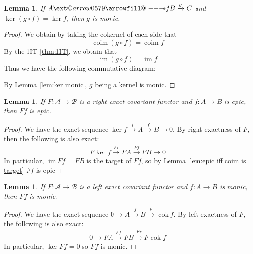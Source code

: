 \documentclass{article}
\makeatletter
\newcommand{\fA}{\mathscr{A}}
\newcommand{\fB}{\mathscr{B}}
\DeclareMathOperator{\im}{im}
\DeclareMathOperator{\coim}{coim}
\DeclareMathOperator{\cok}{cok}
\newcommand\xtwoheadrightarrow[2][]{%
  \ext@arrow 0579{\twoheadrightarrowfill@}{#1}{#2}}
\newcommand\twoheadrightarrowfill@{%
  \arrowfill@\relbar\relbar\twoheadrightarrow}
\newtheorem{lemma}[theorem]{Lemma}
\makeatother
\begin{document}
\begin{lemma}\label{lem:comp with epic and ker}
    If $A\xtwoheadrightarrow{f}B\xrightarrow{g} C$ and $\ker(g\circ f)=\ker f$, then $g$ is monic.
\end{lemma}
\begin{proof}
    We obtain by taking the cokernel of each side that
    \[
    \coim (g\circ f)=\coim f
    \]
    By the 1IT \ref{thm:1IT}, we obtain that
    \[
    \im (g\circ f)=\im f
    \]
    Thus we have the following commutative diagram:
    \begin{center}
    \end{center}
    By Lemma \ref{lem:ker monic}, $g$ being a kernel is monic.
\end{proof}
\begin{lemma}\label{lem:covariant right exact preserves epic}
    If $F:\fA \to \fB$ is a right exact covariant functor and $f:A\to B$ is epic, then $Ff$ is epic.
\end{lemma}
\begin{proof}
    We have the exact sequence $\ker f \xrightarrow{i} A \xrightarrow{f}B \rightarrow0 $. By right exactness of $F$, then the following is also exact:
    \begin{align*}
        F\ker f \xrightarrow{Fi} FA \xrightarrow{Ff} FB \rightarrow 0
    \end{align*}
    In particular, $\im Ff=FB$ is the target of $Ff$, so by Lemma \ref{lem:epic iff coim is target} $Ff$ is epic.
\end{proof}
\begin{lemma}\label{lem:covariant left exact preserves monic}
    If $F:\fA \to \fB$ is a left exact covariant functor and $f:A\to B$ is monic, then $Ff$ is monic.
\end{lemma}
\begin{proof}
    We have the exact sequence $0\rightarrow A \xrightarrow{f}B\xrightarrow{p}\cok f$. By left exactness of $F$, the following is also exact:
    \begin{align*}
        0\rightarrow FA \xrightarrow{Ff} FB \xrightarrow{Fp} F\cok f
    \end{align*}
    In particular, $\ker Ff=0$ so $Ff$ is monic.
\end{proof}
\end{document}
